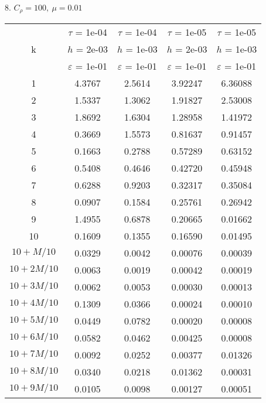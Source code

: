 8. $C_{\rho} = 100, \ \mu = 0.01$
\begin{center}
	\begin{tabular}{ |c|c|c|c|c| } 
		\hline
		& $\tau$ = 1e-04 & $\tau$ = 1e-04 & $\tau$ = 1e-05 & $\tau$ = 1e-05 \\ 
		k & $h$ = 2e-03 & $h$ = 1e-03 & $h$ = 2e-03 & $h$ = 1e-03 \\ 
		& $\varepsilon$ = 1e-01 & $\varepsilon$ = 1e-01 & $\varepsilon$ = 1e-01 & $\varepsilon$ = 1e-01 \\ 
		\hline
		1 & 4.3767 & 2.5614 & 3.92247 & 6.36088 \\
		\hline
		2 & 1.5337 & 1.3062 & 1.91827 & 2.53008 \\
		\hline
		3 & 1.8692 & 1.6304 & 1.28958 & 1.41972 \\
		\hline
		4 & 0.3669 & 1.5573 & 0.81637 & 0.91457 \\
		\hline
		5 & 0.1663 & 0.2788 & 0.57289 & 0.63152 \\
		\hline
		6 & 0.5408 & 0.4646 & 0.42720 & 0.45948 \\
		\hline
		7 & 0.6288 & 0.9203 & 0.32317 & 0.35084 \\
		\hline
		8 & 0.0907 & 0.1584 & 0.25761 & 0.26942 \\
		\hline
		9 & 1.4955 & 0.6878 & 0.20665 & 0.01662 \\
		\hline
		10 & 0.1609 & 0.1355 & 0.16590 & 0.01495 \\
		\hline
		$10 + M/10$ & 0.0329 & 0.0042 & 0.00076 & 0.00039 \\
		\hline
		$10 + 2M/10$ & 0.0063 & 0.0019 & 0.00042 & 0.00019 \\
		\hline
		$10 + 3M/10$ & 0.0062 & 0.0053 & 0.00030 & 0.00013 \\
		\hline
		$10 + 4M/10$ & 0.1309 & 0.0366 & 0.00024 & 0.00010 \\
		\hline
		$10 + 5M/10$ & 0.0449 & 0.0782 & 0.00020 & 0.00008 \\
		\hline
		$10 + 6M/10$ & 0.0582 & 0.0462 & 0.00425 & 0.00008 \\
		\hline
		$10 + 7M/10$ & 0.0092 & 0.0252 & 0.00377 & 0.01326 \\
		\hline
		$10 + 8M/10$ & 0.0340 & 0.0218 & 0.01362 & 0.00031 \\
		\hline
		$10 + 9M/10$ & 0.0105 & 0.0098 & 0.00127 & 0.00051 \\
		\hline
	\end{tabular}
\end{center}


